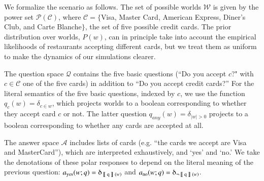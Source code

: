\documentclass[12pt, floatsintext, jou]{apa6}
\newcommand{\den}[2][]{
\(
\left\llbracket\;\text{#2}\;\right\rrbracket^{#1}
\)
}
\begin{document}
We formalize the scenario as follows. The set of possible worlds $\mathcal{W}$ is given by the power set $\mathcal{P}(\mathcal{C})$, where $\mathcal{C} = \{$Visa, Master Card, American Express, Diner's Club, and Carte Blanche$\}$, the set of five possible credit cards. %
The prior distribution over worlds, $P(w)$, can in principle take into account the empirical likelihoods of restaurants accepting different cards, but we treat them as uniform to make the dynamics of our simulations clearer. %

The question space $\mathcal{Q}$ contains the five basic questions (``Do you accept $c$?" with $c \in \mathcal{C}$ one of the five cards) in addition to ``Do you accept credit cards?'' For the literal semantics of the five basic questions, indexed by $c$, we use the function $q_c(w) = \delta_{c \in w}$, which projects worlds to a boolean corresponding to whether they accept card $c$ or not.
The latter question $q_{any}(w)  = \delta_{|w| > 0}$ projects to a boolean corresponding to whether any cards are accepted at all. %

The answer space $\mathcal{A}$ includes lists of cards (e.g. ``the cards we accept are Visa and MasterCard''), which are interpreted exhaustively, and  `yes' and `no.' We take the denotations of these polar responses to depend on the literal meaning of the previous question: $a_{\text{yes}}(w;q) = \delta_{\textrm{\den{q}}(w)}$ and $a_{\text{no}}(w;q) = \delta_{\neg \textrm{\den{q}}(w)}$.
\end{document}
